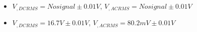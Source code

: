 \begin{itemize}
     \item $V_{, DCRMS}=No signal\pm 0.01\unit{V}$, $V_{, ACRMS}=No signal\pm 0.01\unit{V}$ 
     \item $V_{, DCRMS}=16.7V\pm 0.01\unit{V}$, $V_{, ACRMS}=80.2mV\pm 0.01\unit{V}$\\
\end{itemize}